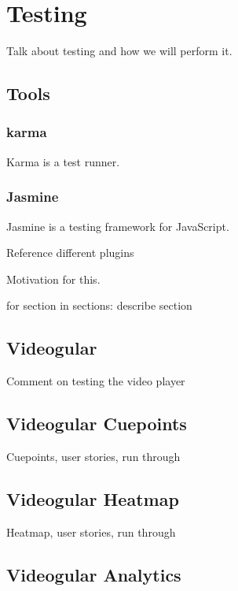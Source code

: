 \chapter{Testing} \label{Chapter: Testing}

Talk about testing and how we will perform it.

\section{Tools}

\subsection{karma}

Karma is a test runner.

\subsection{Jasmine}

Jasmine is a testing framework for JavaScript.


Reference different plugins

Motivation for this.

{for section in sections: describe section}

\section{Videogular}

Comment on testing the video player

\section{Videogular Cuepoints}

Cuepoints, user stories, run through

\section{Videogular Heatmap}

Heatmap, user stories, run through

\section{Videogular Analytics}

